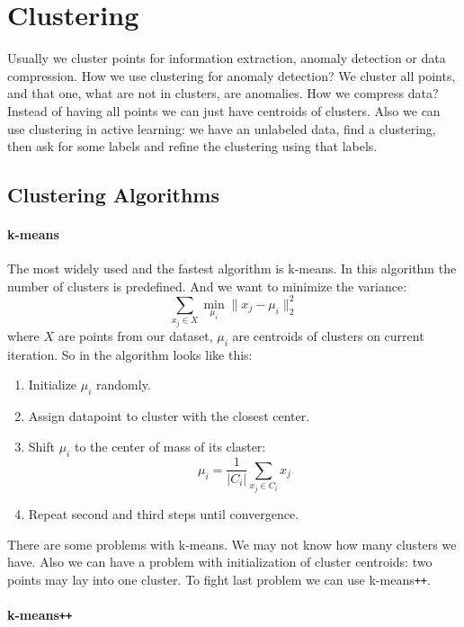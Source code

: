 \chapter{Clustering}

{\sf Usually we cluster points for information extraction, anomaly detection or data compression. How we use clustering for anomaly detection? We cluster all points, and that one, what are not in clusters, are anomalies. How we compress data? Instead of having all points we can just have centroids of clusters. Also we can use clustering in active learning: we have an unlabeled data, find a clustering, then ask for some labels and refine the clustering using that labels.}

\section{Clustering Algorithms}
\vspace{-0.6cm}
\subsubsection*{k-means}

The most widely used and the fastest algorithm is k-means. In this algorithm the number of clusters is predefined. And we want to minimize the variance:
$$\sum\limits_{x_j\in X}\min\limits_{\mu_i}\|x_j-\mu_i\|_2^2$$
where $X$ are points from our dataset, $\mu_i$ are centroids of clusters on current iteration. So in the algorithm looks like this:
\begin{enumerate}
	\item Initialize $\mu_i$ randomly.
	\item Assign datapoint to cluster with the closest center.
	\item Shift $\mu_i$ to the center of mass of its claster: $$\mu_i=\frac{1}{|C_i|}\sum\limits_{x_j\in C_i}x_j$$
	\item Repeat second and third steps until convergence.
\end{enumerate} 
There are some problems with k-means. We may not know how many clusters we have. Also we can have a problem with initialization of cluster centroids: two points may lay into one cluster. To fight last problem we can use k-means\texttt{++}.

\subsubsection*{k-means\texttt{++}}


